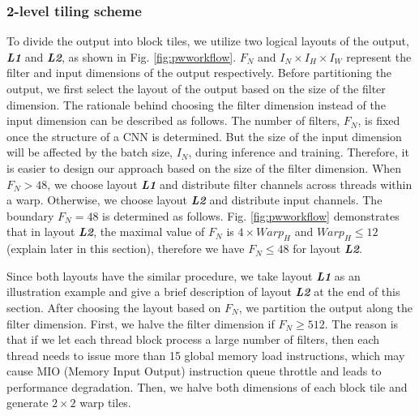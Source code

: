 \subsubsection{2-level tiling scheme}
To divide the output into block tiles, we utilize two logical layouts of the output, \textbf{\emph{L1}} and \textbf{\emph{L2}}, as shown in Fig. \ref{fig:pwworkflow}.
$F_N$ and $I_N \times I_H \times I_W$ represent the filter and input dimensions of the output respectively. 
Before partitioning the output, we first select the layout of the output based on the size of the filter dimension.
The rationale behind choosing the filter dimension instead of the input dimension can be described as follows.
The number of filters, $F_N$, is fixed once the structure of a CNN is determined.
But the size of the input dimension will be affected by the batch size, $I_N$, during inference and training.
Therefore, it is easier to design our approach based on the size of the filter dimension.
When $F_N > 48$, we choose layout \textbf{\emph{L1}} and distribute filter channels across threads within a warp.
Otherwise, we choose layout \textbf{\emph{L2}} and distribute input channels.
The boundary $F_N = 48$ is determined as follows.
Fig. \ref{fig:pwworkflow} demonstrates that in layout \textbf{\emph{L2}}, the maximal value of $F_N$ is $4 \times Warp_H$ and $Warp_H \leq 12$ (explain later in this section), therefore we have $F_N \leq 48$ for layout \textbf{\emph{L2}}.

Since both layouts have the similar procedure, we take layout \textbf{\emph{L1}} as an illustration example and give a brief description of layout \textbf{\emph{L2}} at the end of this section.
After choosing the layout based on $F_N$, we partition the output along the filter dimension.
First, we halve the filter dimension if $F_N \geq 512$.
The reason is that if we let each thread block process a large number of filters, then each thread needs to issue more than 15 global memory load instructions, which may cause MIO (Memory Input Output) instruction queue throttle and leads to performance degradation.
Then, we halve both dimensions of each block tile and generate $2 \times 2$ warp tiles.
